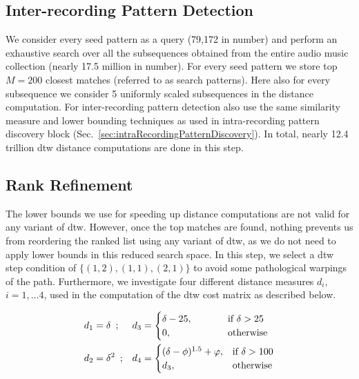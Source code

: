 \subsection{Inter-recording Pattern Detection}
\label{sec:patternSearch}


We consider every seed pattern as a query (79,172 in number) and perform an exhaustive search over all the subsequences obtained from the entire audio music collection (nearly 17.5 million in number). For every seed pattern we store top $M=200$ closest matches (referred to as search patterns). Here also for every subsequence we consider 5 uniformly  scaled subsequences in the distance computation. For inter-recording pattern detection also use the same similarity measure and lower bounding techniques as used in intra-recording pattern discovery block (Sec.~\ref{sec:intraRecordingPatternDiscovery}). In total, nearly 12.4 trillion \gls{dtw} distance computations are done in this step.



\subsection{Rank Refinement}
\label{sec:rankRefinement}

The lower bounds we use for speeding up distance computations are not valid for any variant of \gls{dtw}. However, once the top matches are found, nothing prevents us from reordering the ranked list using any variant of \gls{dtw}, as we do not need to apply lower bounds in this reduced search space. In this step, we select a \gls{dtw} step condition of $\lbrace(1,2), (1,1), (2,1)\rbrace$ to avoid some pathological warpings of the path. Furthermore, we investigate four different distance measures $d_i$, $i=1,\dots 4$, used in the computation of the \gls{dtw} cost matrix as described below. %

\begin{equation}
\begin{aligned}
d_1& = \delta \hspace{.5em};&
d_3& = 
\begin{cases}
\delta-25, & \hspace{1cm} \text{if } \delta >25\\
0, & \hspace{1cm}\text{otherwise } 
\end{cases}
\\
d_2& = \delta^2 \hspace{.5em};&
d_4 &= 
\begin{cases}
(\delta-\phi)^{1.5} + \varphi, & \text{if } \delta >100\\
d_3, & \text{otherwise}
\end{cases}
\end{aligned}
\label{eq:distances}
\end{equation}



